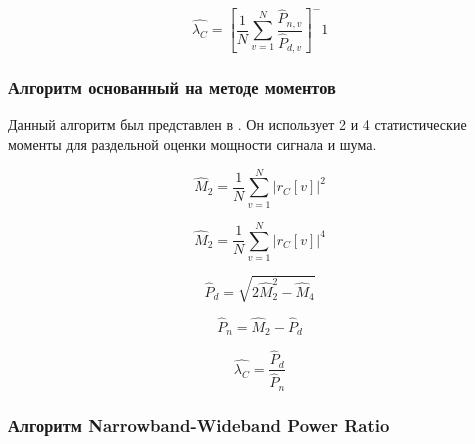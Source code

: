 \begin{center}
\begin{equation}
	\hat{\lambda_C} = [ \frac{1}{N} \sum \limits_{v=1}^{N} \frac{\hat P_{n,v}}{\hat P_{d,v}} ]^-1
\end{equation}
\end{center}

\subsubsection{Алгоритм основанный на методе моментов}
\label{sssec:mm}
Данный алгоритм был представлен в \cite{snr_pauluzzi}. Он использует 2 и 4 статистические моменты для раздельной оценки
мощности сигнала и шума.
\begin{center}
\begin{equation}
	\hat M_2 = \frac{1}{N} \sum \limits_{v=1}^{N} \left|r_C[v] \right| ^2
\end{equation}
\end{center}

\begin{center}
\begin{equation}
	\hat M_2 = \frac{1}{N} \sum \limits_{v=1}^{N} \left|r_C[v] \right| ^4
\end{equation}
\end{center}

\begin{center}
\begin{equation}
	\hat P_d = \sqrt{2 \hat M^2_2 - \hat M_4} 
\end{equation}
\end{center}

\begin{center}
\begin{equation}
	\hat P_n = \hat M_2 - \hat P_d
\end{equation}
\end{center}

\begin{center}
\begin{equation}
	\hat{\lambda_C} = \frac{\hat P_d}{\hat P_n}
\end{equation}
\end{center}

\subsubsection{Алгоритм Narrowband-Wideband Power Ratio}
\label{sssec:nwpr}

